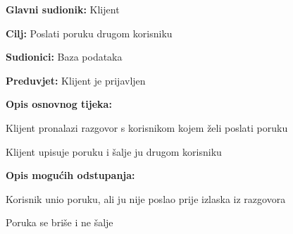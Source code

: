 						\noindent {}
						\begin{packed_item}
							
							\item \textbf{Glavni sudionik: }Klijent
							\item  \textbf{Cilj: }Poslati poruku drugom korisniku
							\item  \textbf{Sudionici: }Baza podataka
							\item  \textbf{Preduvjet: }Klijent je prijavljen
							\item  \textbf{Opis osnovnog tijeka:}
							
							\item[] \begin{packed_enum}
								
								\item Klijent pronalazi razgovor s korisnikom kojem želi poslati poruku
								\item Klijent upisuje poruku i šalje ju drugom korisniku
								  
							\end{packed_enum}
							
							\item  \textbf{Opis mogućih odstupanja:}
							
							\item[] \begin{packed_item}
								
								\item[3.a] Korisnik unio poruku, ali ju nije poslao prije izlaska iz razgovora
								\item[] \begin{packed_enum}
									
									\item Poruka se briše i ne šalje 
									
									
								\end{packed_enum}
								
							\end{packed_item}
						\end{packed_item}

